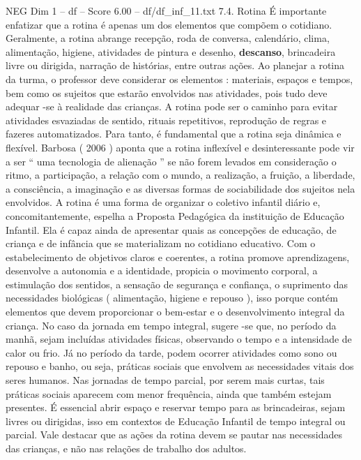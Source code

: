 \begin{textsample}{NEG Dim 1 – df – Score 6.00 – df/df\_inf\_11.txt}  \label{ex:f1_neg_169}
7.4.
Rotina É importante enfatizar que a rotina é apenas um dos elementos que compõem o cotidiano.
Geralmente, a rotina abrange recepção, roda de conversa, calendário, clima, alimentação, higiene, atividades de pintura e desenho, \textbf{descanso}, brincadeira livre ou dirigida, narração de histórias, entre outras ações.
Ao planejar a rotina da turma, o professor deve considerar os elementos : materiais, espaços e tempos, bem como os sujeitos que estarão envolvidos nas atividades, pois tudo deve adequar -se à realidade das crianças.
A rotina pode ser o caminho para evitar atividades esvaziadas de sentido, rituais repetitivos, reprodução de regras e fazeres automatizados.
Para tanto, é fundamental que a rotina seja dinâmica e flexível.
Barbosa ( 2006 ) aponta que a rotina inflexível e desinteressante pode vir a ser “ uma tecnologia de alienação ” se não forem levados em consideração o ritmo, a participação, a relação com o mundo, a realização, a fruição, a liberdade, a consciência, a imaginação e as diversas formas de sociabilidade dos sujeitos nela envolvidos.
A rotina é uma forma de organizar o coletivo infantil diário e, concomitantemente, espelha a Proposta Pedagógica da instituição de Educação Infantil.
Ela é capaz ainda de apresentar quais as concepções de educação, de criança e de infância que se materializam no cotidiano educativo.
Com o estabelecimento de objetivos claros e coerentes, a rotina promove aprendizagens, desenvolve a autonomia e a identidade, propicia o movimento corporal, a estimulação dos sentidos, a sensação de segurança e confiança, o suprimento das necessidades biológicas ( alimentação, higiene e repouso ), isso porque contém elementos que devem proporcionar o bem-estar e o desenvolvimento integral da criança.
No caso da jornada em tempo integral, sugere -se que, no período da manhã, sejam incluídas atividades físicas, observando o tempo e a intensidade de calor ou frio.
Já no período da tarde, podem ocorrer atividades como sono ou repouso e banho, ou seja, práticas sociais que envolvem as necessidades vitais dos seres humanos.
Nas jornadas de tempo parcial, por serem mais curtas, tais práticas sociais aparecem com menor frequência, ainda que também estejam presentes.
É essencial abrir espaço e reservar tempo para as brincadeiras, sejam livres ou dirigidas, isso em contextos de Educação Infantil de tempo integral ou parcial.
Vale destacar que as ações da rotina devem se pautar nas necessidades das crianças, e não nas relações de trabalho dos adultos.

\end{textsample}
